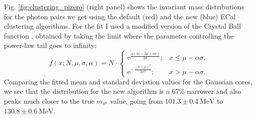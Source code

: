 Fig. \ref{fig:clustering_pizero} (right panel) shows the invariant mass distributions for the photon pairs we get using the default (red) and the new (blue) ECal clustering algorithms. For the fit I used a modified version of the Crystal Ball function \cite{Gaiser1982}, obtained by taking the limit where the parameter controlling the power-law tail goes to infinity:
\begin{equation}
	f(x; N, \mu, \sigma, \alpha) = N \cdot
	\left\{
	\begin{array}{ll}
		\mathrm{e}^{\frac{\alpha(2x-2\mu+\alpha\sigma)}{2\sigma}};& x \leq \mu - \alpha\sigma,\\
		\mathrm{e}^{-\frac{(x-\mu)^{2}}{2\sigma^{2}}};& x > \mu - \alpha\sigma.
	\end{array}
	\right.
\end{equation}
Comparing the fitted mean and standard deviation values for the Gaussian cores, we see that the distribution for the new algorithm is a $67\%$ narrower and also peaks much closer to the true $m_{\pi^{0}}$ value, going from $101.3 \pm 0.4 \ \mathrm{MeV}$ to $130.8 \pm 0.6 \ \mathrm{MeV}$.
